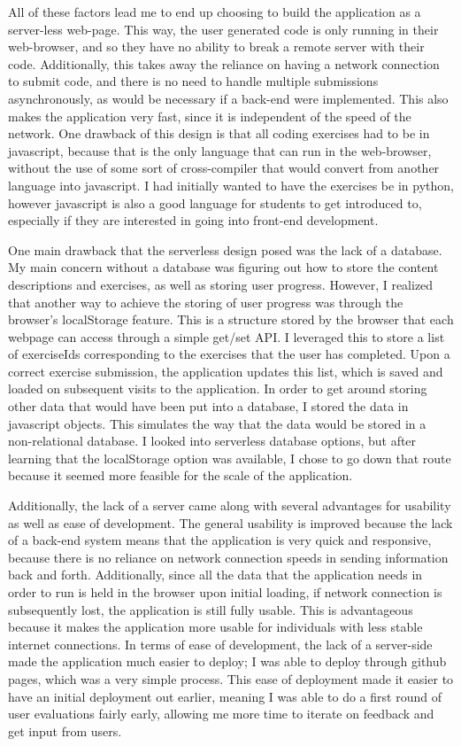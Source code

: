 \documentclass[10pt,twocolumn]{article}
\begin{document}
All of these factors lead me to end up choosing to build the application as a server-less web-page. This way, the user generated 
code is only running in their web-browser, and so they have no ability to break a remote server with their code. Additionally, 
this takes away the reliance on having a network connection to submit code, and there is no need to handle multiple submissions 
asynchronously, as would be necessary if a back-end were implemented. This also makes the application very fast, since it is 
independent of the speed of the network. One drawback of this design is that all coding exercises had to be in javascript, 
because that is the only language that can run in the web-browser, without the use of some sort of cross-compiler that would 
convert from another language into javascript. I had initially wanted to have the exercises be in python, however javascript 
is also a good language for students to get introduced to, especially if they are interested in going into front-end development. 

One main drawback that the serverless design posed was the lack of a database. My main concern without a database was figuring
out how to store the content descriptions and exercises, as well as storing user progress. However, I realized that another 
way to achieve the storing of user progress was through the browser's localStorage feature. This is a structure stored by the 
browser that each webpage can access through a simple get/set API. I leveraged this to store a list of exerciseIds corresponding 
to the exercises that the user has completed. Upon a correct exercise submission, the application updates this list, which is 
saved and loaded on subsequent visits to the application. In order to get around storing other data that would have been put 
into a database, I stored the data in javascript objects. This simulates the way that the data would be stored in a non-relational
database. I looked into serverless database options, but after learning that the localStorage option was available, I chose to go 
down that route because it seemed more feasible for the scale of the application. 

Additionally, the lack of a server came along with several advantages for usability as well as ease of development. The general
usability is improved because the lack of a back-end system means that the application is very quick and responsive, because 
there is no reliance on network connection speeds in sending information back and forth. Additionally, since all the data 
that the application needs in order to run is held in the browser upon initial loading, if network connection is subsequently 
lost, the application is still fully usable. This is advantageous because it makes the application more usable for individuals 
with less stable internet connections. In terms of ease of development, the lack of a server-side made the application much 
easier to deploy; I was able to deploy through github pages, which was a very simple process. This ease of deployment made 
it easier to have an initial deployment out earlier, meaning I was able to do a first round of user evaluations fairly early, 
allowing me more time to iterate on feedback and get input from users. 
\end{document}
